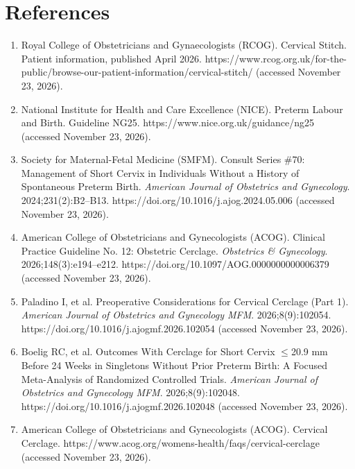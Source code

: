 \section*{References}
\begin{enumerate}
  \item Royal College of Obstetricians and Gynaecologists (RCOG). Cervical Stitch. Patient information, published April 2026. https://www.rcog.org.uk/for-the-public/browse-our-patient-information/cervical-stitch/ (accessed November 23, 2026).
  \item National Institute for Health and Care Excellence (NICE). Preterm Labour and Birth. Guideline NG25. https://www.nice.org.uk/guidance/ng25 (accessed November 23, 2026).
  \item Society for Maternal-Fetal Medicine (SMFM). Consult Series \#70: Management of Short Cervix in Individuals Without a History of Spontaneous Preterm Birth. \textit{American Journal of Obstetrics and Gynecology}. 2024;231(2):B2--B13. https://doi.org/10.1016/j.ajog.2024.05.006 (accessed November 23, 2026).
  \item American College of Obstetricians and Gynecologists (ACOG). Clinical Practice Guideline No. 12: Obstetric Cerclage. \textit{Obstetrics \& Gynecology}. 2026;148(3):e194--e212. https://doi.org/10.1097/AOG.0000000000006379 (accessed November 23, 2026).
  \item Paladino I, et al. Preoperative Considerations for Cervical Cerclage (Part 1). \textit{American Journal of Obstetrics and Gynecology MFM}. 2026;8(9):102054. https://doi.org/10.1016/j.ajogmf.2026.102054 (accessed November 23, 2026).
  \item Boelig RC, et al. Outcomes With Cerclage for Short Cervix $\leq$20.9 mm Before 24 Weeks in Singletons Without Prior Preterm Birth: A Focused Meta-Analysis of Randomized Controlled Trials. \textit{American Journal of Obstetrics and Gynecology MFM}. 2026;8(9):102048. https://doi.org/10.1016/j.ajogmf.2026.102048 (accessed November 23, 2026).
  \item American College of Obstetricians and Gynecologists (ACOG). Cervical Cerclage. https://www.acog.org/womens-health/faqs/cervical-cerclage (accessed November 23, 2026).
\end{enumerate}

\clearpage

